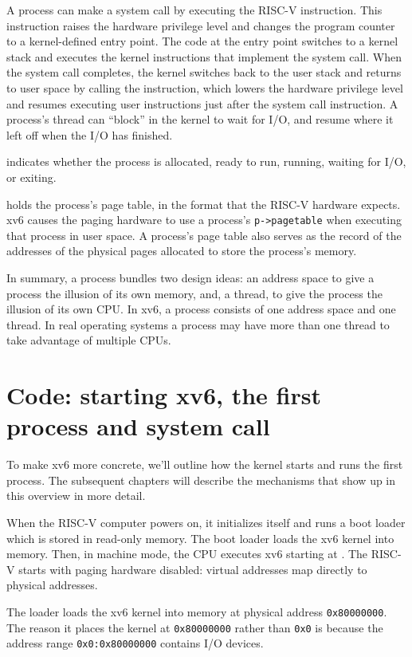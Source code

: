 A process can make a system call by executing the RISC-V 
instruction. This instruction raises the hardware privilege level and
changes the program counter to a kernel-defined entry point.  The code
at the entry point switches to a kernel stack and executes the kernel
instructions that implement the system call.  When the system call
completes, the kernel switches back to the user stack and returns to
user space by calling the  instruction, which lowers
the hardware privilege level and resumes executing user instructions
just after the system call instruction.  A process's thread can
``block'' in the kernel to wait for I/O, and resume where it left off
when the I/O has finished.

indicates whether the process is allocated, ready
to run, running, waiting for I/O, or exiting.

holds the process's page table, in the format
that the RISC-V hardware expects.
xv6 causes the paging hardware to use a process's
\lstinline{p->pagetable}
when executing that process in user space.
A process's page table also serves as the record of the
addresses of the physical pages allocated to store the process's
memory.

In summary, a process bundles two design ideas: an address space to
give a process the illusion of its own memory, and, a thread, to give
the process the illusion of its own CPU.  In xv6, a process consists
of one address space and one thread.  In real operating systems a
process may have more than one thread to take advantage of multiple CPUs.

\section{Code: starting xv6, the first process and system call}
To make xv6 more concrete, we'll outline how the kernel starts and
runs the first process. The subsequent chapters will describe the
mechanisms that show up in this overview in more detail.

When the RISC-V computer powers on, it initializes
itself and runs a boot loader which is stored in read-only
memory.  The boot loader loads the xv6 kernel into memory.  Then, in
machine mode, the CPU executes xv6 starting at
.
The RISC-V starts with paging hardware disabled:
virtual addresses map directly to physical addresses.

The loader loads the xv6 kernel into memory at physical address
\texttt{0x80000000}.
The reason it places the kernel at
\texttt{0x80000000}
rather than
\texttt{0x0}
is because the address range
\texttt{0x0:0x80000000}
contains I/O devices.

